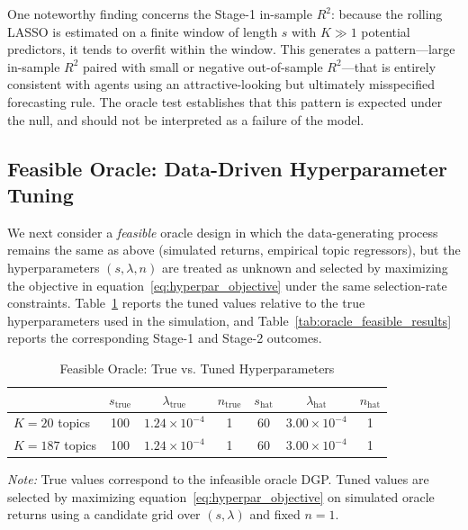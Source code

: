 \documentclass[11pt]{article}
\begin{document}
One noteworthy finding concerns the Stage-1 in-sample $R^2$: because the rolling LASSO is
estimated on a finite window of length $s$ with $K \gg 1$ potential predictors, it tends to
overfit within the window.
This generates a pattern---large in-sample $R^2$ paired with small or negative out-of-sample
$R^2$---that is entirely consistent with agents using an attractive-looking but ultimately
misspecified forecasting rule.
The oracle test establishes that this pattern is expected under the null, and should not be
interpreted as a failure of the model.

\subsection*{Feasible Oracle: Data-Driven Hyperparameter Tuning}

We next consider a \emph{feasible} oracle design in which the data-generating process remains
the same as above (simulated returns, empirical topic regressors), but the hyperparameters
$(s,\lambda,n)$ are treated as unknown and selected by maximizing the objective in
equation~\eqref{eq:hyperpar_objective} under the same selection-rate constraints.
Table~\ref{tab:oracle_feasible_hyper} reports the tuned values relative to the true
hyperparameters used in the simulation, and Table~\ref{tab:oracle_feasible_results}
reports the corresponding Stage-1 and Stage-2 outcomes.

\begin{table}[H]
\centering
\caption{Feasible Oracle: True vs. Tuned Hyperparameters}
\label{tab:oracle_feasible_hyper}
\begin{tabularx}{\textwidth}{@{}>{\small}lcccccc@{}}
\toprule
 & \multicolumn{1}{c}{$s_{\text{true}}$}
 & \multicolumn{1}{c}{$\lambda_{\text{true}}$}
 & \multicolumn{1}{c}{$n_{\text{true}}$}
 & \multicolumn{1}{c}{$s_{\text{hat}}$}
 & \multicolumn{1}{c}{$\lambda_{\text{hat}}$}
 & \multicolumn{1}{c}{$n_{\text{hat}}$} \\
\midrule
$K = 20$ topics  & 100 & $1.24 \times 10^{-4}$ & 1 & 60 & $3.00 \times 10^{-4}$ & 1 \\
$K = 187$ topics & 100 & $1.24 \times 10^{-4}$ & 1 & 60 & $3.00 \times 10^{-4}$ & 1 \\
\bottomrule
\end{tabularx}
\medskip
\begin{minipage}{\textwidth}
\footnotesize
\textit{Note:} True values correspond to the infeasible oracle DGP. Tuned values are selected
by maximizing equation~\eqref{eq:hyperpar_objective} on simulated oracle returns using a
candidate grid over $(s,\lambda)$ and fixed $n=1$.
\end{minipage}
\end{table}
\end{document}
